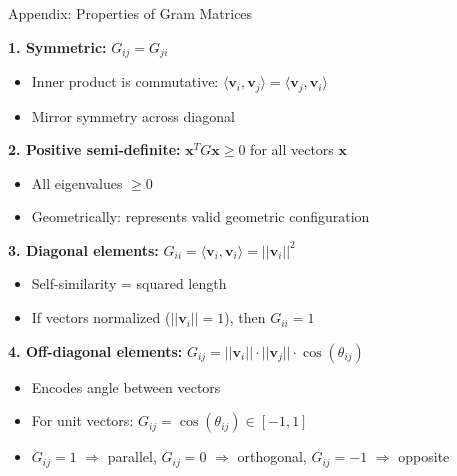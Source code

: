 \documentclass[aspectratio=169,11pt]{beamer}
\begin{document}
\begin{frame}{Appendix: Properties of Gram Matrices}

\textbf{1. Symmetric:} $G_{ij} = G_{ji}$
\begin{itemize}
  \item Inner product is commutative: $\langle \mathbf{v}_i, \mathbf{v}_j \rangle = \langle \mathbf{v}_j, \mathbf{v}_i \rangle$
  \item Mirror symmetry across diagonal
\end{itemize}

\vspace{0.3em}

\textbf{2. Positive semi-definite:} $\mathbf{x}^T G \mathbf{x} \geq 0$ for all vectors $\mathbf{x}$
\begin{itemize}
  \item All eigenvalues $\geq 0$
  \item Geometrically: represents valid geometric configuration
\end{itemize}

\vspace{0.3em}

\textbf{3. Diagonal elements:} $G_{ii} = \langle \mathbf{v}_i, \mathbf{v}_i \rangle = ||\mathbf{v}_i||^2$
\begin{itemize}
  \item Self-similarity = squared length
  \item If vectors normalized ($||\mathbf{v}_i|| = 1$), then $G_{ii} = 1$
\end{itemize}

\vspace{0.3em}

\textbf{4. Off-diagonal elements:} $G_{ij} = ||\mathbf{v}_i|| \cdot ||\mathbf{v}_j|| \cdot \cos(\theta_{ij})$
\begin{itemize}
  \item Encodes angle between vectors
  \item For unit vectors: $G_{ij} = \cos(\theta_{ij}) \in [-1, 1]$
  \item $G_{ij} = 1$ $\Rightarrow$ parallel, $G_{ij} = 0$ $\Rightarrow$ orthogonal, $G_{ij} = -1$ $\Rightarrow$ opposite
\end{itemize}

\end{frame}
\end{document}
